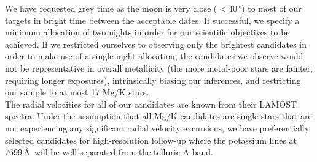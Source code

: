 \documentclass{article}
\begin{document}
\begin{technicalinfo}
We have requested grey time as the moon is very close ($<40\,^\circ$) to most of our targets in bright time between the acceptable dates. If successful,  we specify a minimum allocation of two nights in order for our scientific objectives to be achieved. If we restricted ourselves to observing only the brightest candidates in order to make use of a single night allocation, the candidates we observe would not be representative in overall metallicity (the more metal-poor stars are fainter, requiring longer exposures), intrinsically biasing our inferences, and restricting our sample to at most 17 Mg/K stars.\\


The radial velocities for all of our candidates are known from their LAMOST spectra. Under the assumption that all Mg/K candidates are single stars that are not experiencing any significant radial velocity excursions, we have preferentially selected candidates for high-resolution follow-up where the potassium lines at 7699\,\AA\ will be well-separated from the telluric A-band.
\end{technicalinfo}



\begin{smoka}
\smokacheck
\end{smoka} 
\end{document}
